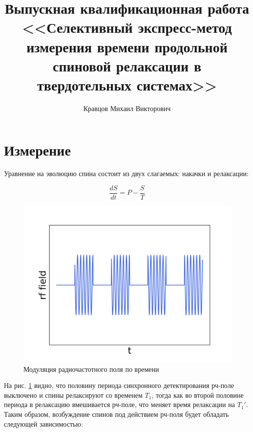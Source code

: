 \documentclass[10pt]{article}
\author{Кравцов Михаил Викторович}
\title{Выпускная квалификационная работа \textbf{<<Селективный экспресс-метод измерения времени продольной спиновой релаксации в твердотельных системах>>}}
\begin{document}
	
\maketitle	
\newpage
\tableofcontents
\newpage

\twocolumn
\section{Измерение}\label{measurment}

Уравнение на эволюцию спина состоит из двух слагаемых: накачки и релаксации:

\begin{equation}\label{eq:DE}
\frac{dS}{dt} = P - \frac{S}{T}
\end{equation}

\begin{figure}[h]
	\includegraphics[scale = 0.4]{rf_on_off.png}
	\caption{Модуляция радиочастотного поля по времени}
	\label{fig:rf_on_off}
\end{figure}

На рис. \ref{fig:rf_on_off} видно, что половину периода синхронного детектирования рч-поле выключено и спины релаксируют со временем $T_1$, тогда как во второй половине периода в релаксацию вмешивается рч-поле, что меняет время релаксации на $T_1'$. \\

Таким образом, возбуждение спинов под действием рч-поля будет обладать следующей зависимостью:
\end{document}
